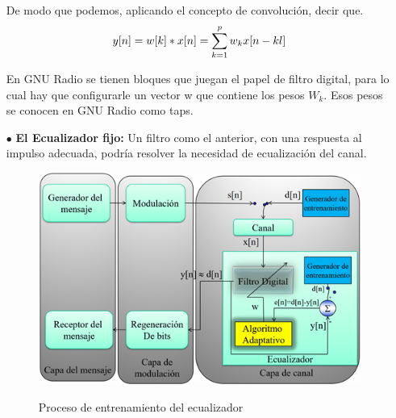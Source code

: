 \begin{itemize}
De modo que podemos, aplicando el concepto de convolución, decir que.\\

\begin{equation} \label{capcuatro_treintacuatro}
	 y[n]=w[k]*x[n]= \sum_{k=1}^{p}w_{k} x[n-kl] \\
\end{equation}
	
En GNU Radio se tienen bloques que juegan el papel de filtro digital, para lo cual hay que configurarle un vector w que contiene los pesos $W_k$. Esos pesos se conocen en GNU Radio como taps.\\

	\item [$\bullet$] \textbf{El Ecualizador fijo:} Un filtro como el anterior, con una respuesta al impulso adecuada, podría resolver la necesidad de ecualización del canal. \\

	\begin{figure}[h!]
		\captionsetup{justification = raggedright, singlelinecheck = false}
		\caption{Proceso de entrenamiento del ecualizador} 
		\centering
		\includegraphics[scale=1]{Imagenes/Ecualizador.png}
		\label{fig:Ecualizador}
	\end{figure}

\vspace{300px}
	

\end{itemize}
